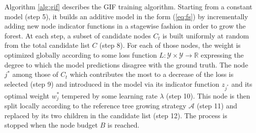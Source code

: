 \documentclass{article}
\DeclareMathOperator*{\argmin}{arg\,min}
\begin{document}


Algorithm \ref{alg:gif} describes the GIF training algorithm.  Starting from a
constant model (step 5), it builds an additive model in the form (\ref{eq:fs})
by incrementally adding new node indicator functions in a stagewise fashion in
order to grow the forest.  At each step, a subset of candidate nodes $C_t$ is
built uniformly at random from the total candidate list $C$ (step 8). 
For each of those nodes, the weight is optimized globally according to some 
loss function $L: \mathcal{Y} \times \mathcal{Y} \rightarrow \mathbb{R}$ 
expressing the degree to which the model predictions disagree with the ground 
truth.
The node $j^*$ among those of $C_t$ which contributes the most to a decrease of 
the loss is selected (step 9) and introduced in the model via its indicator 
function $z_{j^*}$ and its optimal weight $w^*_j$ tempered by some learning 
rate $\lambda$ (step 10). This node is then split locally according to the 
reference tree growing strategy $\mathcal{A}$ (step 11) and replaced by its two 
children in the candidate list (step 12). The process is stopped when the node 
budget $B$ is reached.
\end{document}
